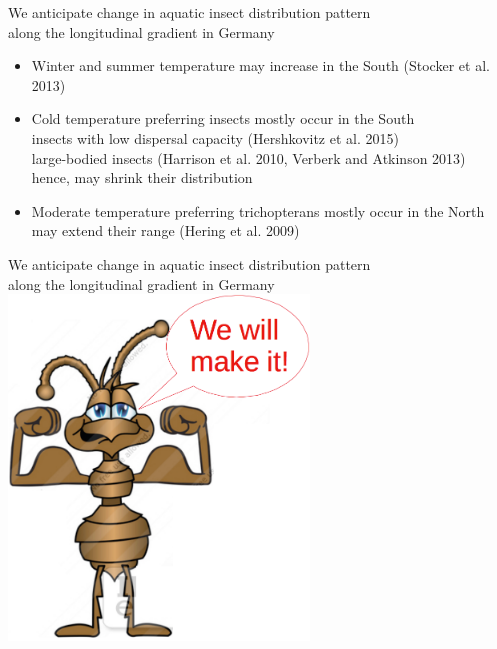 \documentclass[10pt, compress]{beamer}
\begin{document}
\begin{frame}{We anticipate change in aquatic insect distribution pattern\protect\\ along the longitudinal gradient in Germany}
\begin{itemize}
\item \alert{Winter and summer temperature may increase in the South} \footnotesize{(Stocker et al. 2013)}
\pause
\item \normalsize \alert{Cold temperature preferring insects} mostly occur in the South\\
\pause
\vspace{10pt}
insects with low dispersal capacity \footnotesize{(Hershkovitz et al. 2015)}\\
\pause
\vspace{10pt}
\normalsize large-bodied insects \footnotesize{(Harrison et al. 2010, Verberk and Atkinson 2013)}\\
\pause
\vspace{10pt}
\normalsize \alert{hence, may shrink their distribution}
\pause
\medskip
\item \normalsize \alert{Moderate temperature preferring trichopterans} mostly occur in the North may extend their range \footnotesize{(Hering et al. 2009)}
\end{itemize}
\end{frame}

\begin{frame}{We anticipate change in aquatic insect distribution pattern\protect\\ along the longitudinal gradient in Germany}
\centering
\includegraphics[width=0.6\textwidth]{images/Brave.png}
\end{frame}

\end{document}
